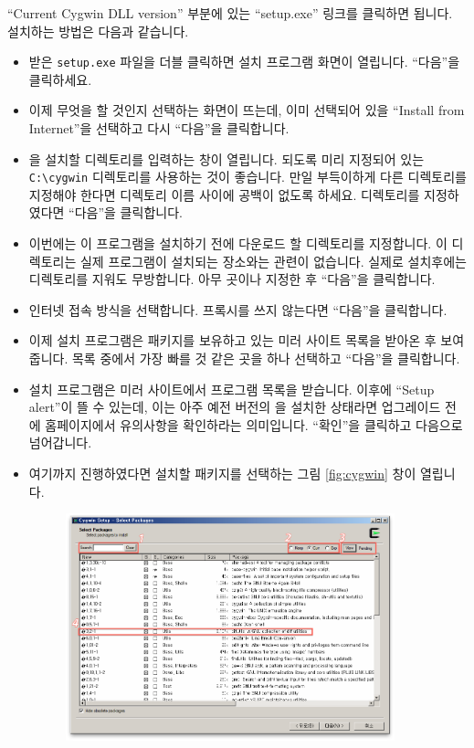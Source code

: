 \begin{center}
\end{center}

``Current Cygwin DLL version'' 부분에 있는 ``setup.exe'' 링크를 클릭하면
됩니다. 설치하는 방법은 다음과 같습니다.

\begin{itemize}
\item 받은 \texttt{setup.exe} 파일을 더블 클릭하면 설치 프로그램 화면이
  열립니다. ``다음''을 클릭하세요.
\item 이제 무엇을 할 것인지 선택하는 화면이 뜨는데, 이미 선택되어 있을
  ``Install from Internet''을 선택하고 다시 ``다음''을 클릭합니다.
\item \CYGWIN{}을 설치할 디렉토리를 입력하는 창이 열립니다. 되도록 미리
  지정되어 있는 \texttt{C:\textbackslash cygwin} 디렉토리를 사용하는 것이
  좋습니다. 만일 부득이하게 다른 디렉토리를 지정해야 한다면 디렉토리 이름
  사이에 공백이 없도록 하세요. 디렉토리를 지정하였다면 ``다음''을 클릭합니다.
\item 이번에는 \CYGWIN{}이 \UNIX{} 프로그램을 설치하기 전에 다운로드 할
  디렉토리를 지정합니다. 이 디렉토리는 실제 \UNIX{} 프로그램이 설치되는
  장소와는 관련이 없습니다. 실제로 설치후에는 디렉토리를 지워도
  무방합니다. 아무 곳이나 지정한 후 ``다음''을 클릭합니다.
\item 인터넷 접속 방식을 선택합니다. 프록시를 쓰지 않는다면 ``다음''을
  클릭합니다.
\item 이제 설치 프로그램은 \CYGWIN{} 패키지를 보유하고 있는 미러 사이트 목록을
  받아온 후 보여줍니다. 목록 중에서 가장 빠를 것 같은 곳을 하나
  선택하고 ``다음''을 클릭합니다.
\item 설치 프로그램은 미러 사이트에서 프로그램 목록을 받습니다. 이후에 ``Setup
  alert''이 뜰 수 있는데, 이는 아주 예전 버전의 \CYGWIN{}을 설치한 상태라면
  업그레이드 전에 홈페이지에서 유의사항을 확인하라는 의미입니다. ``확인''을
  클릭하고 다음으로 넘어갑니다.
\item 여기까지 진행하였다면 설치할 \CYGWIN{} 패키지를 선택하는 그림
  \ref{fig:cygwin} 창이 열립니다.
  \begin{figure}[t]
    \centering
    \includegraphics[width=0.9\textwidth]{img/cygwin.png}

\end{figure}
\end{itemize}
